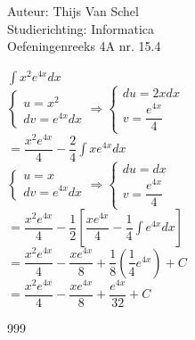 \documentclass[a4paper]{article}
\newcommand{\dint}{\displaystyle\int}
\begin{document}
  
\noindent \large Auteur: Thijs Van Schel \\
\noindent \large Studierichting: Informatica\\
\noindent \large Oefeningenreeks 4A nr. 15.4\\

\medskip

\normalsize

$\dint x^2e^{4x}dx$\\

$\left\{
\begin{array}{l}
u = x^2 \\
dv = e^{4x}dx
\end{array}
\right.
\Rightarrow
\left\{
\begin{array}{l}
du = 2xdx \\
v = \dfrac{e^{4x}}{4}
\end{array}
\right.$\\

$=\dfrac{x^2e^{4x}}{4}-\dfrac{2}{4}\dint xe^{4x}dx$\\

$\left\{
\begin{array}{l}
u = x \\
dv = e^{4x}dx
\end{array}
\right.
\Rightarrow
\left\{
\begin{array}{l}
du = dx \\
v = \dfrac{e^{4x}}{4}
\end{array}
\right.$\\

$=\dfrac{x^2e^{4x}}{4}-\dfrac{1}{2}\left[\dfrac{xe^{4x}}{4}-\dfrac{1}{4}\dint e^{4x}dx\right]$\\

$=\dfrac{x^2e^{4x}}{4}-\dfrac{xe^{4x}}{8}+\dfrac{1}{8}\left(\dfrac{1}{4}e^{4x}\right)+C$\\

$=\dfrac{x^2e^{4x}}{4}-\dfrac{xe^{4x}}{8}+\dfrac{e^{4x}}{32}+C$\\


\begin{thebibliography}{999}
\end{thebibliography}
\end{document}
